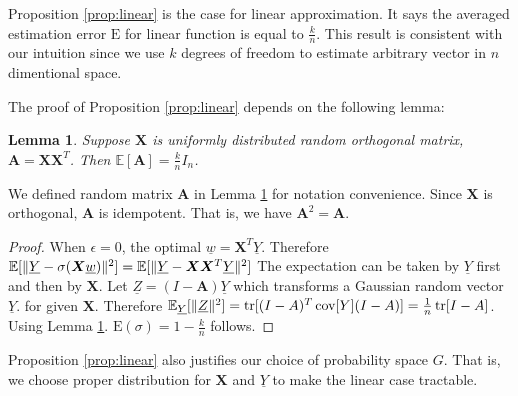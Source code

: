 \documentclass[conference,letterpaper]{IEEEtran}
\newtheorem{lemma}{Lemma}
\DeclarePairedDelimiter\norm{\lVert}{\rVert}
\def\E{\mathbb{E}}
\DeclareMathOperator*{\Tr}{tr}
\DeclareMathOperator*{\Cov}{cov}
\begin{document}
Proposition \ref{prop:linear} is the case for linear approximation.
It says the averaged estimation error $\mathrm{E}$ for linear function is equal to $\frac{k}{n}$.
This result is consistent with our intuition
since we use $k$ degrees of freedom to estimate arbitrary vector in $n$ dimentional space.

The proof of Proposition \ref{prop:linear} depends on the following lemma:
\begin{lemma}\label{lem:A}
Suppose $\bm{X}$ is uniformly distributed random orthogonal matrix, $\bm{A} = \bm{X}\bm{X}^T$.
Then $\E[\bm{A}] = \frac{k}{n} I_n$.
\end{lemma}
We defined random matrix $\bm{A}$ in Lemma \ref{lem:A} for notation convenience.
Since $\bm{X}$ is orthogonal, $\bm{A}$ is idempotent. That is, we have $\bm{A}^2 = \bm{A}$.

\begin{proof}
When $\epsilon = 0$, the optimal $\underline{w} = \bm{X}^T\underline{Y}$. Therefore
$\E[\norm{\underline{Y} - \sigma(\bm{X} \underline{w})}^2] = \E[\norm{\underline{Y}-\bm{X}\bm{X}^T\underline{Y}}^2]$
The expectation can be taken by $\underline{Y}$ first and then by $\bm{X}$.
Let $\underline{Z} = (I-\bm{A}) \underline{Y}$ which transforms a Gaussian random vector $\underline{Y}$.
for given $\bm{X}$. Therefore $\E_{\underline{Y}}[\norm{\underline{Z}}^2] = \Tr[(I-A)^T\Cov[Y](I-A)]
= \frac{1}{n}\Tr[I - A]$. Using Lemma \ref{lem:A}. $\mathrm{E}(\sigma) = 1 - \frac{k}{n}$ follows.
\end{proof}

Proposition \ref{prop:linear} also justifies our choice of probability space $G$.
That is, we choose proper distribution for $\bm{X}$ and $\underline{Y}$ to make the linear case tractable.
\end{document}
